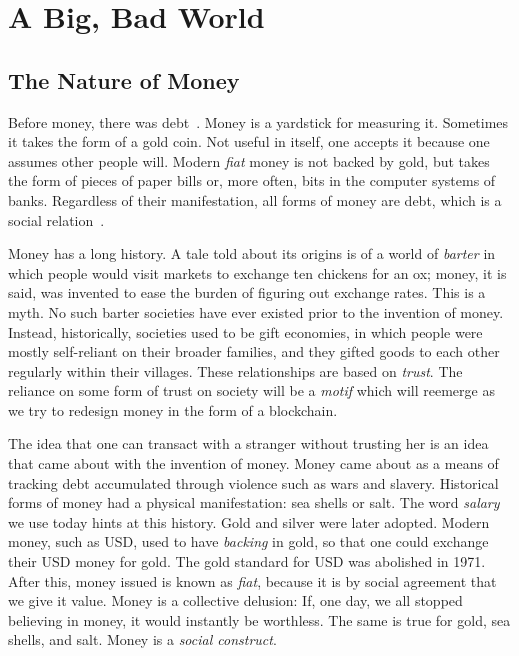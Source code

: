 \chapter{A Big, Bad World}\label{chapter.untrusty-world}


\section{The Nature of Money}

Before money, there was debt~\cite{debt}. Money is a yardstick for measuring
it. Sometimes it takes the form of a gold coin. Not useful in itself, one
accepts it because one assumes other people will. Modern \emph{fiat} money is
not backed by gold, but takes the form of pieces of paper bills or, more often,
bits in the computer systems of banks. Regardless of their manifestation, all
forms of money are debt, which is a social relation~\cite{critical-realism}.

Money has a long history. A tale told about its origins
is of a world of \emph{barter} in which people would visit
markets to exchange ten chickens for an ox; money, it is said, was invented
to ease the burden of figuring out exchange rates. This is a myth.
No such barter societies have ever existed prior to the invention of
money. Instead, historically, societies used to be gift economies,
in which people were mostly self-reliant on their broader families,
and they gifted goods to each other regularly within their villages.
These relationships are based on \emph{trust}. The reliance on some
form of trust on society will be a \emph{motif} which will
reemerge as we try to redesign money in the form of a blockchain.

The idea that one can transact with a stranger without trusting her
is an idea that came about with the invention of money. Money came
about as a means of tracking debt accumulated through violence such
as wars and slavery. Historical forms of money had a physical manifestation:
sea shells or salt. The word \emph{salary} we
use today hints at this history. Gold and silver were later adopted.
Modern money, such as USD, used to have \emph{backing} in gold, so
that one could exchange their USD money for gold. The gold standard
for USD was abolished in 1971. After this, money issued is known as
\emph{fiat}, because it is by social agreement that we give it value.
Money is a collective delusion: If, one day, we all stopped believing
in money, it would instantly be worthless. The same is true for gold,
sea shells, and salt. Money is a \emph{social construct}.

